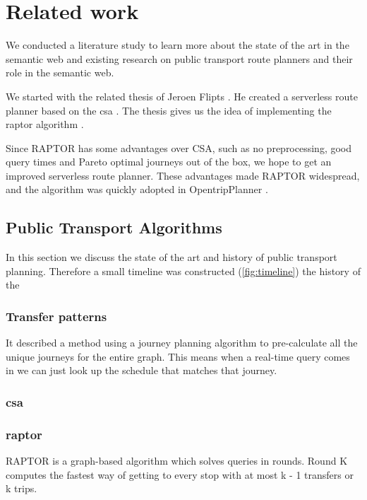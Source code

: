\chapter{Related work}
\label{chap:rel_work}

We conducted a literature study to learn more about the state of the art in the semantic web and existing research on public transport route planners and their role in the semantic web.

We started with the related thesis of Jeroen Flipts \cite{Flipts2020}. He created a serverless route planner based on the \acrfull{csa} \cite{csa}. The thesis gives us the idea of implementing the \acrfull{raptor} algorithm \cite{Delling2014Oct}.

Since RAPTOR has some advantages over CSA, such as no preprocessing, good query times and Pareto optimal journeys out of the box, we hope to get an improved serverless route planner. These advantages made RAPTOR widespread, and the algorithm was quickly adopted in OpentripPlanner \cite{raptorinopentripplanner}.

\section{Public Transport Algorithms}


In this section we discuss the state of the art and history of public transport planning. Therefore a small timeline was constructed (\autoref{fig:timeline}) the history of the 
\subsection{Transfer patterns}
It described a method using a journey planning algorithm to pre-calculate all the unique journeys for the entire graph. This means when a real-time query comes in we can just look up the schedule that matches that journey.
\subsection{\acrfull{csa}}
\subsection{\acrfull{raptor}}
RAPTOR is a graph-based algorithm which solves queries in rounds. Round K computes the fastest way of getting to every stop with at most k - 1 transfers or k trips.

